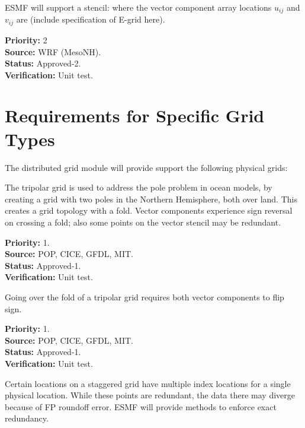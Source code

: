 \sreq{\egrid}

ESMF will support a \egrid stencil: where the vector component array
locations $u_{ij}$ and $v_{ij}$ are (include specification of E-grid here).

\begin{reqlist}
{\bf Priority:} 2\\ 
{\bf Source:} WRF (MesoNH). \\
{\bf Status:} Approved-2. \\
{\bf Verification:} Unit test.
\end{reqlist}

\part{Requirements for Specific Grid Types} \label{DG:gridtypes}

The distributed grid module will provide support the following 
physical grids:


The tripolar grid \cite{ref:m1996} is used to address the pole problem
in ocean models, by creating a grid with two poles in the Northern
Hemisphere, both over land. This creates a grid topology with a
fold. Vector components experience sign reversal on crossing a fold;
also some points on the vector stencil may be redundant.

\begin{reqlist}
{\bf Priority:} 1. \\ 
{\bf Source:} POP, CICE, GFDL, MIT. \\
{\bf Status:} Approved-1. \\
{\bf Verification:} Unit test. 
\end{reqlist}


Going over the fold of a tripolar grid requires both vector components
to flip sign.

\begin{reqlist}
{\bf Priority:} 1. \\ 
{\bf Source:} POP, CICE, GFDL, MIT. \\
{\bf Status:} Approved-1. \\
{\bf Verification:} Unit test. \\
\end{reqlist}


Certain locations on a staggered grid have multiple index locations
for a single physical location. While these points are redundant, the
data there may diverge because of FP roundoff error. ESMF will provide
methods to enforce exact redundancy.

